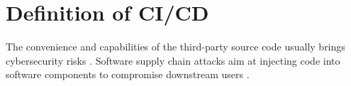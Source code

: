 \section{Definition of CI/CD}




The convenience and capabilities of the third-party source code usually 
brings cybersecurity risks \cite{10.1145/2814270.2814313}. Software supply 
chain attacks aim at injecting code into software components to compromise
downstream users \cite{10179304}. 
